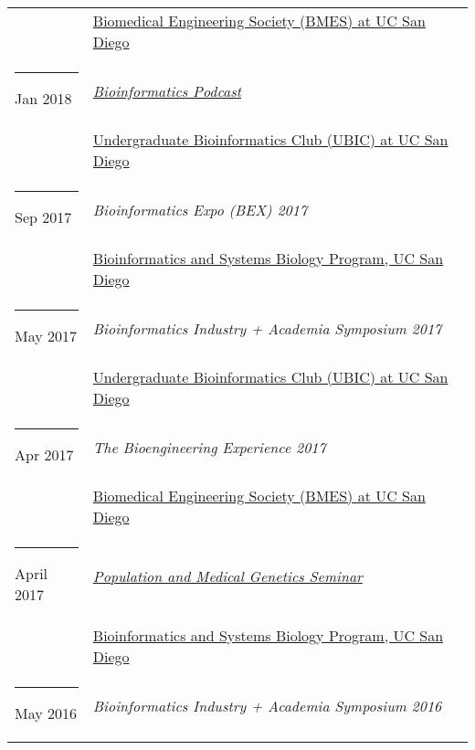 \documentclass[margin,line]{res}
\begin{document}
\begin{resume}
\begin{longtable}{@{}p{0.7in}p{4in}}
\hspace*{-4mm} & \hspace{4mm} \href{http://bmes.ucsd.edu/}{Biomedical Engineering Society (BMES) at UC San Diego}\\
\hspace*{-4mm} \rule{-1mm}{5mm} Jan 2018 & \href{https://soundcloud.com/ubicucsd/ubic-podcast-episode-1}{\textit{Bioinformatics Podcast}}\\*
\hspace*{-4mm} & \hspace{4mm} \href{http://ubicucsd.github.io/}{Undergraduate Bioinformatics Club (UBIC) at UC San Diego}\\
\hspace*{-4mm} \rule{-1mm}{5mm} Sep 2017 & \textit{Bioinformatics Expo (BEX) 2017}\\*
\hspace*{-4mm} & \hspace{4mm} \href{http://bioinformatics.ucsd.edu/}{Bioinformatics and Systems Biology Program, UC San Diego}\\
\hspace*{-4mm} \rule{-1mm}{5mm} May 2017 & \textit{Bioinformatics Industry + Academia Symposium 2017}\\*
\hspace*{-4mm} & \hspace{4mm} \href{http://ubicucsd.github.io/}{Undergraduate Bioinformatics Club (UBIC) at UC San Diego}\\
\hspace*{-4mm} \rule{-1mm}{5mm} Apr 2017 & \textit{The Bioengineering Experience 2017}\\*
\hspace*{-4mm} & \hspace{4mm} \href{http://bmes.ucsd.edu/}{Biomedical Engineering Society (BMES) at UC San Diego}\\
\hspace*{-4mm} \rule{-1mm}{5mm} April 2017 & \href{https://gymreklab.github.io/teaching/medpopgen_seminar.html}{\textit{Population and Medical Genetics Seminar}}\\*
\hspace*{-4mm} & \hspace{4mm} \href{http://ubicucsd.github.io/}{Bioinformatics and Systems Biology Program, UC San Diego}\\
\hspace*{-4mm} \rule{-1mm}{5mm} May 2016 & \textit{Bioinformatics Industry + Academia Symposium 2016}\\*

\end{longtable}
\end{resume}
\end{document}
